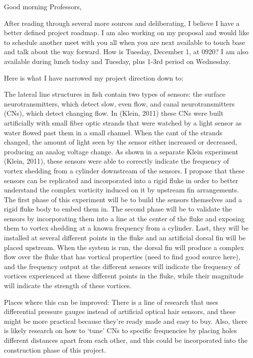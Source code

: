 Good morning Professors,

After reading through several more sources and deliberating, I believe I have a better defined project roadmap. I am also working on my proposal and would like to schedule another meet with you all when you are next available to touch base and talk about the way forward. How is Tuesday, December 1, at 0920? I am also available during lunch today and Tuesday, plus 1-3rd period on Wednesday.

Here is what I have narrowed my project direction down to:

The lateral line structures in fish contain two types of sensors: the surface neurotransmitters, which detect slow, even flow, and canal neurotransmitters (CNs), which detect changing flow. In (Klein, 2011) these CNs were built artificially with small fiber optic strands that were watched by a light sensor as water flowed past them in a small channel. When the cant of the strands changed, the amount of light seen by the sensor either increased or decreased, producing an analog voltage change. As shown in a separate Klein experiment (Klein, 2011), these sensors were able to correctly indicate the frequency of vortex shedding from a cylinder downstream of the sensors. I propose that these sensors can be replicated and incorporated into a rigid fluke in order to better understand the complex vorticity induced on it by upstream fin arrangements. The first phase of this experiment will be to build the sensors themselves and a rigid fluke body to embed them in. The second phase will be to validate the sensors by incorporating them into a line at the center of the fluke and exposing them to vortex shedding at a known frequency from a cylinder. Last, they will be installed at several different points in the fluke and an artificial dorsal fin will be placed upstream. When the system is run, the dorsal fin will produce a complex flow over the fluke that has vortical properties (need to find good source here), and the frequency output at the different sensors will indicate the frequency of vortices experienced at these different points in the fluke, while their magnitude will indicate the strength of these vortices.


Places where this can be improved: There is a line of research that uses differential pressure gauges instead of artificial optical hair sensors, and these might be more practical because they’re ready made and easy to buy. Also, there is likely research on how to ‘tune’ CNs to specific frequencies by placing holes different distances apart from each other, and this could be incorporated into the construction phase of this project.
